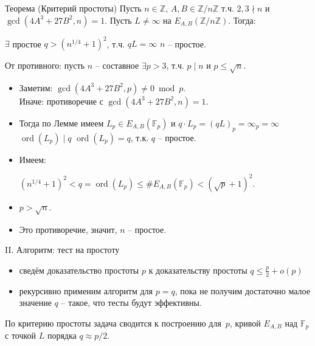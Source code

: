 \documentclass{beamer}
\begin{document}
\begin{frame}
\begin{block}{Теорема (Критерий простоты)}
    \label{t3}
    Пусть $n \in \mathbb{Z}$, $A, B \in \mathbb{Z}/n\mathbb{Z}$ т.ч. $2,3 \nmid n$ и $\gcd(4A^3 + 27B^2, n) =1$. Пусть $L \neq \infty$ на $E_{A,B}(\mathbb{Z}/n\mathbb{Z})$. Тогда:
    \begin{center}
        $\exists$ простое $q > (n^{1/4} + 1)^2$, т.ч. $qL = \infty$ \structure{$\implies$} $n$ -- простое.
    \end{center} 
\end{block}
\end{frame}

\begin{frame}
\structure{$\triangleleft$}
От противного: пусть $n$ -- составное \structure{$\Rightarrow$} $\exists p > 3$, т.ч. $p \mid n$ и $p \leq \sqrt{n}$.
\begin{itemize}
    \item Заметим: $\gcd(4A^3 + 27B^2, p) \neq 0 \bmod p$.\\Иначе: противоречие с $\gcd(4A^3 + 27B^2, n) = 1$.
    \item Тогда по Лемме имеем $L_p \in E_{A,B}(\mathbb{F}_p)$ и $q\cdot L_p = (qL)_p = \infty_p = \infty$ \structure{$\Rightarrow$} $\operatorname{ord}(L_p) \mid q$ \structure{$\Rightarrow$} $\operatorname{ord}(L_p) = q$, т.к. $q$ -- простое.
    \item Имеем:

    $(n^{1/4} + 1)^2 < q = \operatorname{ord}(L_p) \leq \#E_{A,B}(\mathbb{F}_p) < (\sqrt{p} + 1)^2$.
    \item \structure{$\implies$} $p > \sqrt{n}$.
    \item Это противоречие, значит, $n$ -- простое. \structure{$\triangleright$}
\end{itemize}
\end{frame}

\begin{frame}{II. Алгоритм: тест на простоту}
    \begin{itemize}
    	\item сведём доказательство простоты $p$ к доказательству простоты $q \leq \frac{p}{2} + o(p)$
    	\item рекурсивно применим алгоритм для $p = q$, пока не получим достаточно малое значение $q$ -- такое, что  тесты будут эффективны.
    \end{itemize}
    
    \vspace{0.5em}
    
    По критерию простоты задача сводится к построению для~$p$, кривой $E_{A,B}$ над $\mathbb{F}_p$ с точкой $L$ порядка $q \approx p/2$.
\end{frame}
\end{document}

